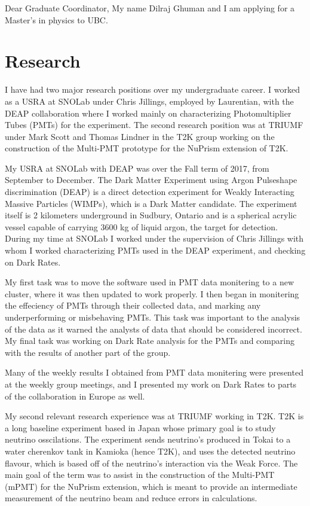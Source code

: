 \documentclass[11pt]{article}
\begin{document}
Dear Graduate Coordinator,
My name Dilraj Ghuman and I am applying for a Master's in physics to UBC. 
\section{Research}
I have had two major research positions over my undergraduate career. I worked as a USRA at SNOLab under Chris Jillings, employed by Laurentian, with the DEAP collaboration where I worked mainly on characterizing Photomultiplier Tubes (PMTs) for the experiment. The second research position was at TRIUMF under Mark Scott and Thomas Lindner in the T2K group working on the construction of the Multi-PMT prototype for the NuPrism extension of T2K.

My USRA at SNOLab with DEAP was over the Fall term of 2017, from September to December. The Dark Matter Experiment using Argon Pulseshape discrimination (DEAP) is a direct detection experiment for Weakly Interacting Massive Particles (WIMPs), which is a Dark Matter candidate. The experiment itself is 2 kilometers underground in Sudbury, Ontario and is a spherical acrylic vessel capable of carrying 3600 kg of liquid argon, the target for detection. During my time at SNOLab I worked under the supervision of Chris Jillings with whom I worked characterizing PMTs used in the DEAP experiment, and checking on Dark Rates.

My first task was to move the software used in PMT data monitering to a new cluster, where it was then updated to work properly. I then began in monitering the effeciency of PMTs through their collected data, and marking any underperforming or misbehaving PMTs. This task was important to the analysis of the data as it warned the analysts of data that should be considered incorrect. My final task was working on Dark Rate analysis for the PMTs and comparing with the results of another part of the group.

Many of the weekly results I obtained from PMT data monitering were presented at the weekly group meetings, and I presented my work on Dark Rates to parts of the collaboration in Europe as well.

My second relevant research experience was at TRIUMF working in T2K. T2K is a long baseline experiment based in Japan whose primary goal is to study neutrino osscilations. The experiment sends neutrino's produced in Tokai to a water cherenkov tank in Kamioka (hence T2K), and uses the detected neutrino flavour, which is based off of the neutrino's interaction via the Weak Force. The main goal of the term was to assist in the construction of the Multi-PMT (mPMT) for the NuPrism extension, which is meant to provide an intermediate measurement of the neutrino beam and reduce errors in calculations.
\end{document}
